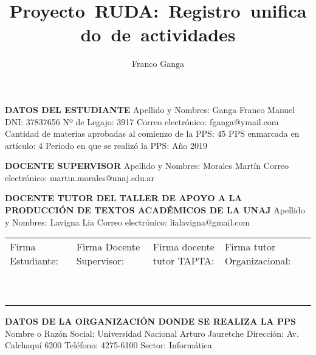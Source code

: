 \documentclass[12pt]{article}
\author{Franco Ganga}
\title{Proyecto\ RUDA:\ Registro\ unificado\ de\ actividades}
\begin{document}
\begin{framed}
        \noindent\textbf{DATOS DEL ESTUDIANTE}\newline
        Apellido y Nombres: Ganga Franco Manuel\newline
        DNI: 37837656\newline
        Nº de Legajo: 3917\newline
        Correo electr\'{o}nico: fganga@ymail.com\newline
        Cantidad de materias aprobadas al comienzo de la PPS: 45\newline
        PPS enmarcada en art\'{i}culo: 4 \newline
        Periodo en que se realiz\'{o} la PPS: Año 2019
\end{framed}

\begin{framed}
        \noindent\textbf{DOCENTE SUPERVISOR}  \newline
        Apellido y Nombres: Morales Martín \newline
        Correo electr\'{o}nico: martin.morales@unaj.edu.ar
\end{framed}

\begin{framed}
        \noindent\textbf{DOCENTE  TUTOR DEL TALLER DE APOYO A LA PRODUCCI\'{O}N DE TEXTOS ACAD\'{E}MICOS DE LA UNAJ}\newline
        Apellido y Nombres: Lavigna Lia \newline
        Correo electr\'{o}nico: lialavigna@gmail.com
\end{framed}

\vfill
\noindent\begin{tabular}{|P{3.3cm}|P{3.3cm}|P{3.3cm}|P{3.3cm}|}
\hline
Firma Estudiante: & Firma Docente Supervisor: & Firma docente tutor TAPTA: & Firma tutor Organizacional: \\
~ & ~ & ~ & ~ \\
~ & ~ & ~ & ~ \\
\hline
\end{tabular}
\newpage
\begin{framed}
\noindent\textbf{DATOS DE LA ORGANIZACI\'{O}N DONDE SE REALIZA LA PPS}\newline
Nombre o Raz\'{o}n Social: Universidad Nacional Arturo Jauretche\newline
Direcci\'{o}n: Av. Calchaquí 6200\newline
Tel\'{e}fono: 4275-6100 \newline
Sector: Informática
\end{framed}
\end{document}
